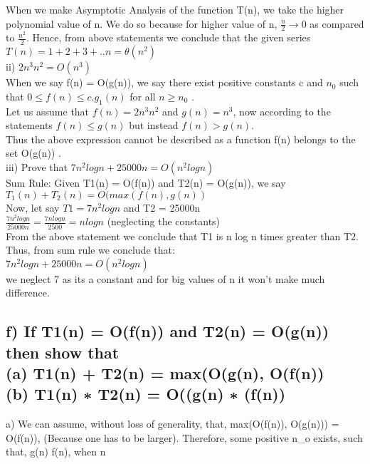 \documentclass[11pt]{article}
\begin{document}
When we make Asymptotic Analysis of the function T(n), we take the higher
polynomial value of n. We do so because for higher value of n, $\frac{n}{2} \rightarrow 0$ as compared to $\frac{n^2}{2}$.
Hence, from above statements we conclude that the given series
$T(n) = 1 + 2 + 3 + ..n = \theta(n^2)$ \\

ii) $2n^3n^2 = O(n^3)$ \\ 
When we say f(n) = O(g(n)), we say there exist positive constants c and $n_0$ such that $0 \leq f(n) \leq c.g_1(n)$ for all $n \geq n_0$ . \\
Let us assume that $f(n)=2n^3n^2$ and $g(n)=n^3$, now according to the statements $f(n) \leq g(n)$ but instead $f(n) > g(n).$ \\
Thus the above expression cannot be described as a function f(n) belongs to
the set O(g(n)) . \\

iii) Prove that $7n^2log n + 25000n = O(n^2log n)$ \\
Sum Rule: Given T1(n) = O(f(n)) and T2(n) = O(g(n)), we say \\
$T_1(n) + T_2(n) = O(max(f(n), g(n))$ \\
Now, let say $T1 = 7n^2log n$ and T2 = 25000n \\
${\frac{7n^2log n}{25000 n}} = {\frac{7n log n}{2500}} = n log n$ (neglecting the constants) \\
From the above statement we conclude that T1 is n log n times greater than T2. Thus, from sum rule we conclude that: \\
$7n^2log n + 25000n = O(n^2log n)$ \\
we neglect 7 as its a constant and for big values of n it won’t make much
difference.




\subsection{f) If T1(n) = O(f(n)) and T2(n) = O(g(n)) then show that\\
(a) T1(n) + T2(n) = max(O(g(n), O(f(n)) \\
(b) T1(n) ∗ T2(n) = O((g(n) ∗ (f(n)) }

a) We can assume, without loss of generality, that, \newline
max(O(f(n)), O(g(n))) = O(f(n)),
(Because one has to be larger). \newline
Therefore, some positive {n_o} exists, such that,
g(n) \leq f(n), when n  \newline
\end{document}
